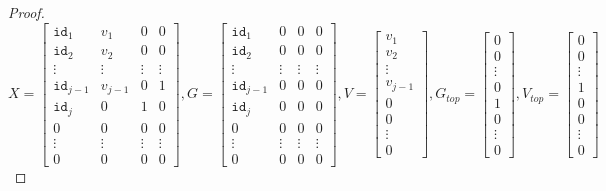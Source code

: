 \begin{proof}
\[
X = \begin{bmatrix}
    \texttt{id}_1 & v_1 & 0 & 0 \\
    \texttt{id}_2 & v_2 & 0 & 0 \\
    \vdots & \vdots & \vdots & \vdots \\
    \texttt{id}_{j-1} & v_{j-1} & 0 & 1 \\
    \texttt{id}_j & 0 & 1 & 0 \\
    0 & 0 & 0 & 0 \\
    \vdots & \vdots & \vdots & \vdots \\
     0 & 0 & 0 & 0
\end{bmatrix}, 
G = \begin{bmatrix}
    \texttt{id}_1 & 0 & 0 & 0 \\
    \texttt{id}_2 & 0 & 0 & 0\\
    \vdots & \vdots & \vdots & \vdots  \\
    \texttt{id}_{j-1} & 0 & 0 & 0\\
    \texttt{id}_j & 0 & 0 & 0\\
    0 & 0 & 0 & 0 \\
    \vdots & \vdots & \vdots & \vdots \\
     0 & 0 & 0 & 0
\end{bmatrix}, 
V = \begin{bmatrix}
    v_1  \\
    v_2 \\
    \vdots   \\
    v_{j-1} \\
    0 \\
    0 \\
    \vdots \\
     0 
\end{bmatrix}, 
G_{top} = \begin{bmatrix}
    0  \\
    0 \\
    \vdots   \\
    0 \\
    1 \\
    0 \\
    \vdots \\
     0 
\end{bmatrix}, 
V_{top} = \begin{bmatrix}
    0  \\
    0 \\
    \vdots   \\
    1 \\
    0 \\
    0 \\
    \vdots \\
     0 
\end{bmatrix}
\]


\end{proof}
